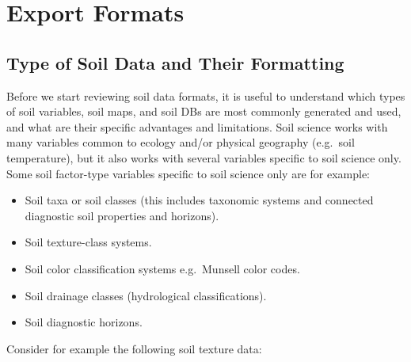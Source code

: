 \documentclass[10pt,b5paper,]{book}
\providecommand{\tightlist}{%
  \setlength{\itemsep}{0pt}\setlength{\parskip}{0pt}}
\theoremstyle{definition}
\theoremstyle{definition}
\theoremstyle{definition}
\theoremstyle{remark}
\begin{document}
\hypertarget{export-formats}{%
\section{Export Formats}\label{export-formats}}

\hypertarget{type-of-soil-data-and-their-formatting}{%
\subsection{Type of Soil Data and Their
Formatting}\label{type-of-soil-data-and-their-formatting}}

Before we start reviewing soil data formats, it is useful to understand
which types of soil variables, soil maps, and soil DBs are most commonly
generated and used, and what are their specific advantages and
limitations. Soil science works with many variables common to ecology
and/or physical geography (e.g.~soil temperature), but it also works
with several variables specific to soil science only. Some soil
factor-type variables specific to soil science only are for example:

\begin{itemize}
\tightlist
\item
  Soil taxa or soil classes (this includes taxonomic systems and
  connected diagnostic soil properties and horizons).
\item
  Soil texture-class systems.
\item
  Soil color classification systems e.g.~Munsell color codes.
\item
  Soil drainage classes (hydrological classifications).
\item
  Soil diagnostic horizons.
\end{itemize}

Consider for example the following soil texture data:
\end{document}

